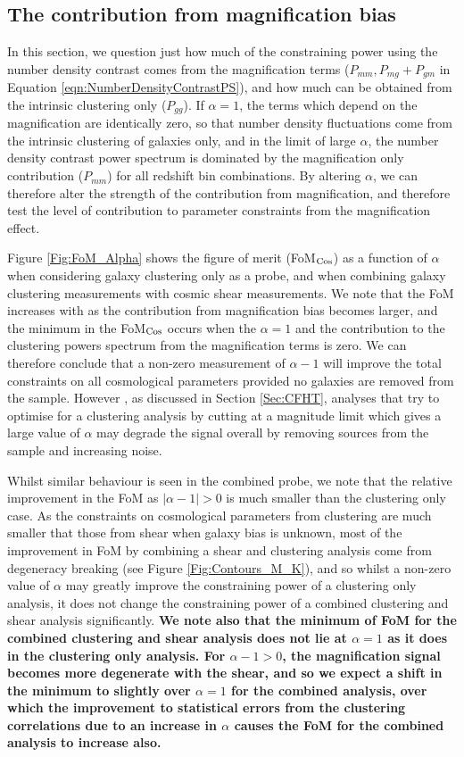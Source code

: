 \documentclass[useAMS,usenatbib,times,letter,amssymb]{mn2e}
\begin{document}
\subsection{The contribution from magnification bias}\label{Sec:Constraints_AlphaDependance}

In this section, we question just how much of the constraining power using the number density contrast comes from the magnification terms ($P_{mm}, P_{mg}+P_{gm} $ in Equation \ref{eqn:NumberDensityContrastPS}), and how much can be obtained from the intrinsic clustering only ($P_{gg}$). If $\alpha = 1$, the terms which depend on the magnification are identically zero, so that number density fluctuations come from the intrinsic clustering of galaxies only, and in the limit of large $\alpha$, the number density contrast power spectrum is dominated by the magnification only contribution ($P_{mm}$) for all redshift bin combinations. By altering $\alpha$, we can therefore alter the strength of the contribution from magnification, and therefore test the level of contribution to parameter constraints from the magnification effect.

Figure \ref{Fig:FoM_Alpha} shows the figure of merit (FoM$_{\rm Cos}$) as a function of $\alpha$ when considering galaxy clustering only as a probe, and when combining galaxy clustering measurements with cosmic shear measurements. We note that the FoM increases with as the contribution from magnification bias becomes larger, and the minimum in the FoM$_{\rm Cos}$ occurs when the $\alpha = 1$ and the contribution to the clustering powers spectrum from the magnification terms is zero. We can therefore conclude that a non-zero measurement of $\alpha-1$ will improve the total constraints on all cosmological parameters provided no galaxies are removed from the sample. However , as discussed in Section \ref{Sec:CFHT}, analyses that try to optimise for a clustering analysis by cutting at a magnitude limit which gives a large value of $\alpha$ may degrade the signal overall by removing sources from the sample and increasing noise.

Whilst similar behaviour is seen in the combined probe, we note that the relative improvement in the FoM as $|\alpha -1|>0$ is much smaller than the clustering only case. As the constraints on cosmological parameters from clustering are much smaller that those from shear when galaxy bias is unknown, most of the improvement in FoM by combining a shear and clustering analysis come from degeneracy breaking (see Figure \ref{Fig:Contours_M_K}), and so whilst a non-zero value of $\alpha$ may greatly improve the constraining power of a clustering only analysis, it does not change the constraining power of a combined clustering and shear analysis significantly. {\bf We note also that the minimum of FoM for the combined clustering and shear analysis does not lie at $\alpha  = 1$ as it does in the clustering only analysis. For $\alpha-1>0$, the magnification signal becomes more degenerate with the shear, and so we expect a shift in the minimum to slightly over $\alpha = 1$ for the combined analysis, over which the improvement to statistical errors from the clustering correlations due to an increase in $\alpha$ causes the FoM for the combined analysis to increase also.}
\end{document}
